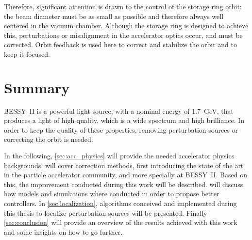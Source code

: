 Therefore, significant attention is drawn to the control of the storage ring orbit: the beam diameter must be as small as possible and therefore always well centered in the vacuum chamber. Although the storage ring is designed to achieve this, perturbations or misalignment in the accelerator optics occur, and must be corrected. Orbit feedback is used here to correct and stabilize the orbit and to keep it focused.

\section{Summary}
BESSY~II is a powerful light source, with a nominal energy of \SI{1.7}{\giga\electronvolt}, that produces a light of high quality, which is a wide spectrum and high brilliance. In order to keep the quality of these properties, removing perturbation sources or correcting the orbit is needed.

In the following, \cref{sec:acc_physics} will provide the needed accelerator physics backgrounds.  will cover correction methods, first introducing the state of the art in the particle accelerator community, and more specially at BESSY~II. Based on this, the improvement conducted during this work will be described.  will discuss how models and simulations where conducted in order to propose better controllers. In \cref{sec:localization}, algorithms conceived and implemented during this thesis to localize perturbation sources will be presented. Finally \cref{sec:conclusion} will provide an overview of the results achieved with this work and some insights on how to go further.
